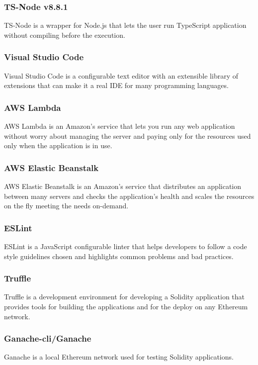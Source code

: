 \subsubsection{TS-Node v8.8.1}
TS-Node is a wrapper for Node.js that lets the user run TypeScript application without compiling before the execution.

\subsubsection{Visual Studio Code}
Visual Studio Code is a configurable text editor with an extensible library of extensions that can make it a real IDE for many programming languages.

\subsubsection{AWS Lambda}
AWS Lambda is an Amazon’s service that lets you run any web application without worry about managing the server and paying only for the resources used only when the application is in use.

\subsubsection{AWS Elastic Beanstalk}
AWS Elastic Beanstalk is an Amazon’s service that distributes an application between many servers and checks the application’s health and scales the resources on the fly meeting the needs on-demand.

\subsubsection{ESLint}
ESLint is a JavaScript configurable linter that helps developers to follow a code style guidelines chosen and highlights common problems and bad practices.

\subsubsection{Truffle}
Truffle is a development environment for developing a Solidity application that provides tools for building the applications and for the deploy on any Ethereum network.

\subsubsection{Ganache-cli/Ganache}
Ganache is a local Ethereum network used for testing Solidity applications.

